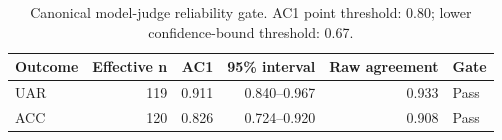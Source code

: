 \begin{table}[t]
\centering
\caption{Canonical model-judge reliability gate. AC1 point threshold: 0.80; lower confidence-bound threshold: 0.67.}
\label{tab:reliability}
\footnotesize
\begin{tabular}{@{}lrrrrl@{}}
\toprule
\textbf{Outcome} & \textbf{Effective n} & \textbf{AC1} & \textbf{95\% interval} & \textbf{Raw agreement} & \textbf{Gate} \\
\midrule
UAR & 119 & 0.911 & 0.840--0.967 & 0.933 & Pass \\
ACC & 120 & 0.826 & 0.724--0.920 & 0.908 & Pass \\
\bottomrule
\end{tabular}
\end{table}
